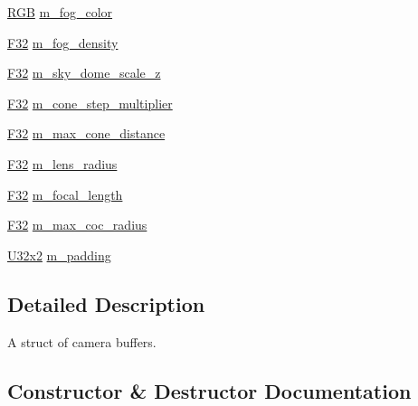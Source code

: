 \begin{DoxyCompactItemize}
\mbox{\hyperlink{structmage_1_1_r_g_b}{R\+GB}} \mbox{\hyperlink{structmage_1_1rendering_1_1_camera_buffer_a6f963e7d607c59ab0dfc3972e06a9739}{m\+\_\+fog\+\_\+color}}
\item 
\mbox{\hyperlink{namespacemage_aa97e833b45f06d60a0a9c4fc22ae02c0}{F32}} \mbox{\hyperlink{structmage_1_1rendering_1_1_camera_buffer_aa9c3a305adfbeb717d480e822ed1c77e}{m\+\_\+fog\+\_\+density}}
\item 
\mbox{\hyperlink{namespacemage_aa97e833b45f06d60a0a9c4fc22ae02c0}{F32}} \mbox{\hyperlink{structmage_1_1rendering_1_1_camera_buffer_abfb4dbb9a228b6a7412b09b179fd157d}{m\+\_\+sky\+\_\+dome\+\_\+scale\+\_\+z}}
\item 
\mbox{\hyperlink{namespacemage_aa97e833b45f06d60a0a9c4fc22ae02c0}{F32}} \mbox{\hyperlink{structmage_1_1rendering_1_1_camera_buffer_a802e8c4ba601b91658cb30c2f1c2cfe2}{m\+\_\+cone\+\_\+step\+\_\+multiplier}}
\item 
\mbox{\hyperlink{namespacemage_aa97e833b45f06d60a0a9c4fc22ae02c0}{F32}} \mbox{\hyperlink{structmage_1_1rendering_1_1_camera_buffer_a99515c320feafb88a2d2fdf24520975d}{m\+\_\+max\+\_\+cone\+\_\+distance}}
\item 
\mbox{\hyperlink{namespacemage_aa97e833b45f06d60a0a9c4fc22ae02c0}{F32}} \mbox{\hyperlink{structmage_1_1rendering_1_1_camera_buffer_a7915bec843e03ad2248c08b10317ccc7}{m\+\_\+lens\+\_\+radius}}
\item 
\mbox{\hyperlink{namespacemage_aa97e833b45f06d60a0a9c4fc22ae02c0}{F32}} \mbox{\hyperlink{structmage_1_1rendering_1_1_camera_buffer_a7ed5079582d476597f8bc4d6a0b3f372}{m\+\_\+focal\+\_\+length}}
\item 
\mbox{\hyperlink{namespacemage_aa97e833b45f06d60a0a9c4fc22ae02c0}{F32}} \mbox{\hyperlink{structmage_1_1rendering_1_1_camera_buffer_a3273510e0a7bbdd9481fe67f9e223f59}{m\+\_\+max\+\_\+coc\+\_\+radius}}
\item 
\mbox{\hyperlink{namespacemage_a31f2bb52b5080e706e1c13de07c0a249}{U32x2}} \mbox{\hyperlink{structmage_1_1rendering_1_1_camera_buffer_ac3d41b35c2d2fc4174841f78d3b05a0d}{m\+\_\+padding}}
\end{DoxyCompactItemize}


\subsection{Detailed Description}
A struct of camera buffers. 

\subsection{Constructor \& Destructor Documentation}
\mbox{\label{structmage_1_1rendering_1_1_camera_buffer_a751c2923a5deb710d7c3957f04c89fcf}} 
